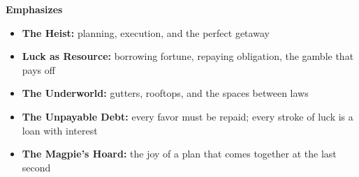 \noindent\textbf{Emphasizes}
\begin{itemize}
  \item \textbf{The Heist:} planning, execution, and the perfect getaway
  \item \textbf{Luck as Resource:} borrowing fortune, repaying obligation, the gamble that pays off
  \item \textbf{The Underworld:} gutters, rooftops, and the spaces between laws
  \item \textbf{The Unpayable Debt:} every favor must be repaid; every stroke of luck is a loan with interest
  \item \textbf{The Magpie's Hoard:} the joy of a plan that comes together at the last second
\end{itemize}

